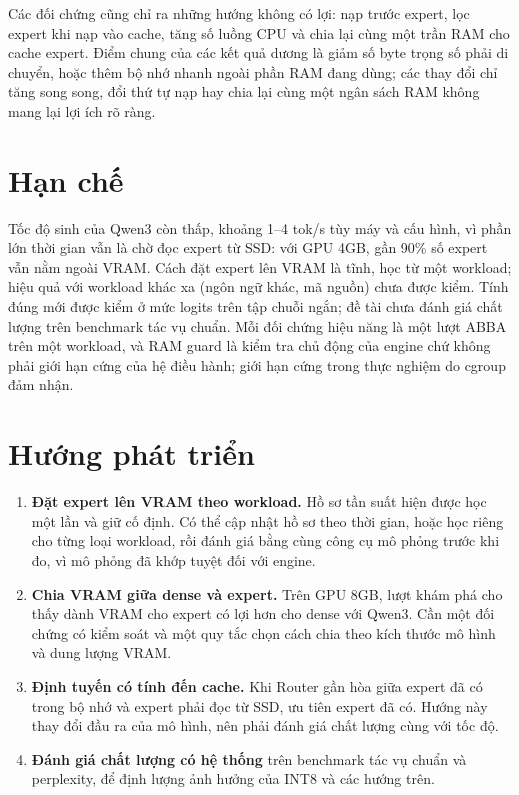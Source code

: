 Các đối chứng cũng chỉ ra những hướng không có lợi: nạp trước expert, lọc expert khi nạp vào cache, tăng số luồng CPU và chia lại cùng một trần RAM cho cache expert. Điểm chung của các kết quả dương là giảm số byte trọng số phải di chuyển, hoặc thêm bộ nhớ nhanh ngoài phần RAM đang dùng; các thay đổi chỉ tăng song song, đổi thứ tự nạp hay chia lại cùng một ngân sách RAM không mang lại lợi ích rõ ràng.

\section*{Hạn chế}

Tốc độ sinh của Qwen3 còn thấp, khoảng 1--4 tok/s tùy máy và cấu hình, vì phần lớn thời gian vẫn là chờ đọc expert từ SSD: với GPU 4GB, gần 90\% số expert vẫn nằm ngoài VRAM. Cách đặt expert lên VRAM là tĩnh, học từ một workload; hiệu quả với workload khác xa (ngôn ngữ khác, mã nguồn) chưa được kiểm. Tính đúng mới được kiểm ở mức logits trên tập chuỗi ngắn; đề tài chưa đánh giá chất lượng trên benchmark tác vụ chuẩn. Mỗi đối chứng hiệu năng là một lượt ABBA trên một workload, và RAM guard là kiểm tra chủ động của engine chứ không phải giới hạn cứng của hệ điều hành; giới hạn cứng trong thực nghiệm do cgroup đảm nhận.

\section*{Hướng phát triển}

\begin{enumerate}
\item \textbf{Đặt expert lên VRAM theo workload.} Hồ sơ tần suất hiện được học một lần và giữ cố định. Có thể cập nhật hồ sơ theo thời gian, hoặc học riêng cho từng loại workload, rồi đánh giá bằng cùng công cụ mô phỏng trước khi đo, vì mô phỏng đã khớp tuyệt đối với engine.
\item \textbf{Chia VRAM giữa dense và expert.} Trên GPU 8GB, lượt khám phá cho thấy dành VRAM cho expert có lợi hơn cho dense với Qwen3. Cần một đối chứng có kiểm soát và một quy tắc chọn cách chia theo kích thước mô hình và dung lượng VRAM.
\item \textbf{Định tuyến có tính đến cache.} Khi Router gần hòa giữa expert đã có trong bộ nhớ và expert phải đọc từ SSD, ưu tiên expert đã có. Hướng này thay đổi đầu ra của mô hình, nên phải đánh giá chất lượng cùng với tốc độ.
\item \textbf{Đánh giá chất lượng có hệ thống} trên benchmark tác vụ chuẩn và perplexity, để định lượng ảnh hưởng của INT8 và các hướng trên.
\end{enumerate}
